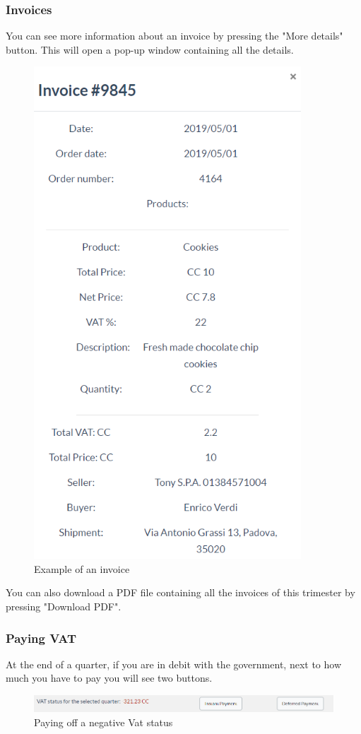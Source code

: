 		\subsubsection{Invoices}
		You can see more information about an invoice by pressing the 
		"More details" button. This will open a pop-up window containing all 
		the details.
		\begin{figure}[H]
			\includegraphics[width=10cm]{res/images/invoice_details.png}
			\centering
			\caption{Example of an invoice}
		\end{figure}
		\noindent You can also download a PDF file containing all the invoices 
		of this trimester by pressing "Download PDF". 
		\subsubsection{Paying VAT}
		At the end of a quarter, if you are in debit with the government, next 
		to how much you have to pay you will see two buttons.
		\begin{figure}[H]
			\includegraphics[width=15cm]{res/images/paying_vat.png}
			\centering
			\caption{Paying off a negative Vat status}
		\end{figure}
